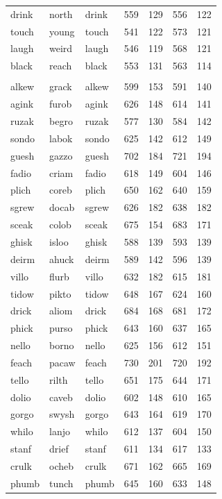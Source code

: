 \documentclass[
]{interact}
\begin{document}
\begin{longtable*}{lllrrrr}
drink & north & drink & 559 & 129 & 556 & 122 \\ 
touch & young & touch & 541 & 122 & 573 & 121 \\ 
laugh & weird & laugh & 546 & 119 & 568 & 121 \\ 
black & reach & black & 553 & 131 & 563 & 114 \\ 
\midrule\addlinespace[2.5pt]
 \\ 
\midrule\addlinespace[2.5pt]
alkew & grack & alkew & 599 & 153 & 591 & 140 \\ 
agink & furob & agink & 626 & 148 & 614 & 141 \\ 
ruzak & begro & ruzak & 577 & 130 & 584 & 142 \\ 
sondo & labok & sondo & 625 & 142 & 612 & 149 \\ 
guesh & gazzo & guesh & 702 & 184 & 721 & 194 \\ 
fadio & criam & fadio & 618 & 149 & 604 & 146 \\ 
plich & coreb & plich & 650 & 162 & 640 & 159 \\ 
sgrew & docab & sgrew & 626 & 182 & 638 & 182 \\ 
sceak & colob & sceak & 675 & 154 & 683 & 171 \\ 
ghisk & isloo & ghisk & 588 & 139 & 593 & 139 \\ 
deirm & ahuck & deirm & 589 & 142 & 596 & 139 \\ 
villo & flurb & villo & 632 & 182 & 615 & 181 \\ 
tidow & pikto & tidow & 648 & 167 & 624 & 160 \\ 
drick & aliom & drick & 684 & 168 & 681 & 172 \\ 
phick & purso & phick & 643 & 160 & 637 & 165 \\ 
nello & borno & nello & 625 & 156 & 612 & 151 \\ 
feach & pacaw & feach & 730 & 201 & 720 & 192 \\ 
tello & rilth & tello & 651 & 175 & 644 & 171 \\ 
dolio & caveb & dolio & 602 & 148 & 610 & 165 \\ 
gorgo & swysh & gorgo & 643 & 164 & 619 & 170 \\ 
whilo & lanjo & whilo & 612 & 137 & 604 & 150 \\ 
stanf & drief & stanf & 611 & 134 & 617 & 133 \\ 
crulk & ocheb & crulk & 671 & 162 & 665 & 169 \\ 
phumb & tunch & phumb & 645 & 160 & 633 & 148 \\ 

\end{longtable*}
\end{document}

